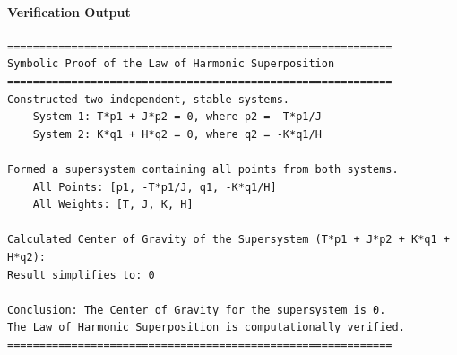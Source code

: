 \paragraph{Verification Output}
\begin{verbatim}
============================================================
Symbolic Proof of the Law of Harmonic Superposition
============================================================
Constructed two independent, stable systems.
    System 1: T*p1 + J*p2 = 0, where p2 = -T*p1/J
    System 2: K*q1 + H*q2 = 0, where q2 = -K*q1/H

Formed a supersystem containing all points from both systems.
    All Points: [p1, -T*p1/J, q1, -K*q1/H]
    All Weights: [T, J, K, H]

Calculated Center of Gravity of the Supersystem (T*p1 + J*p2 + K*q1 + H*q2):
Result simplifies to: 0

Conclusion: The Center of Gravity for the supersystem is 0.
The Law of Harmonic Superposition is computationally verified.
============================================================
\end{verbatim}